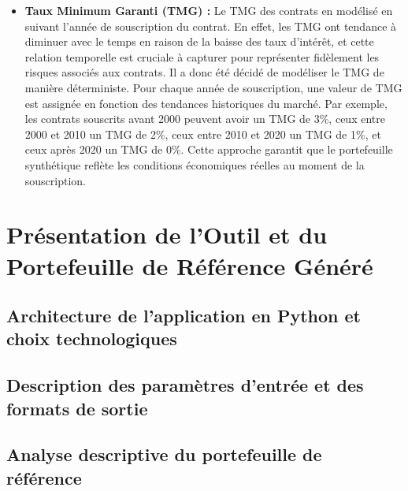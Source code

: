 \begin{itemize}
    \item \textbf{Taux Minimum Garanti (TMG) :} Le TMG des contrats en modélisé en suivant l'année de souscription du contrat. En effet, les TMG ont tendance à diminuer avec le temps en raison de la baisse des taux d'intérêt, et cette relation temporelle est cruciale à capturer pour représenter fidèlement les risques associés aux contrats. Il a donc été décidé de modéliser le TMG de manière déterministe. Pour chaque année de souscription, une valeur de TMG est assignée en fonction des tendances historiques du marché. Par exemple, les contrats souscrits avant 2000 peuvent avoir un TMG de 3\%, ceux entre 2000 et 2010 un TMG de 2\%, ceux entre 2010 et 2020 un TMG de 1\%, et ceux après 2020 un TMG de 0\%. Cette approche garantit que le portefeuille synthétique reflète les conditions économiques réelles au moment de la souscription.
\end{itemize}

\section{Présentation de l'Outil et du Portefeuille de Référence Généré}
\subsection{Architecture de l'application en Python et choix technologiques}
\subsection{Description des paramètres d'entrée et des formats de sortie}
\subsection{Analyse descriptive du portefeuille de référence}




